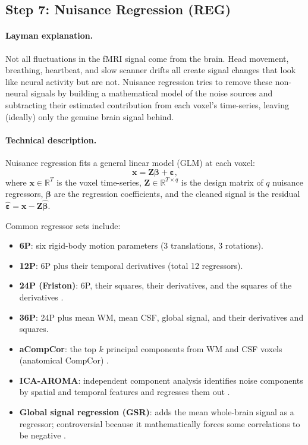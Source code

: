 \documentclass[11pt,a4paper]{article}
\begin{document}
\subsection{Step 7: Nuisance Regression (REG)}
\label{app:reg}

\paragraph{Layman explanation.}
Not all fluctuations in the fMRI signal come from the brain.  Head movement, breathing, heartbeat, and slow scanner drifts all create signal changes that look like neural activity but are not.  Nuisance regression tries to remove these non-neural signals by building a mathematical model of the noise sources and subtracting their estimated contribution from each voxel's time-series, leaving (ideally) only the genuine brain signal behind.

\paragraph{Technical description.}
Nuisance regression fits a general linear model (GLM) at each voxel:
\begin{equation}
    \mathbf{x} = \mathbf{Z}\boldsymbol\beta + \boldsymbol\varepsilon,
\end{equation}
where $\mathbf{x} \in \mathbb{R}^T$ is the voxel time-series, $\mathbf{Z} \in \mathbb{R}^{T \times q}$ is the design matrix of $q$ nuisance regressors, $\boldsymbol\beta$ are the regression coefficients, and the cleaned signal is the residual $\hat{\boldsymbol\varepsilon} = \mathbf{x} - \mathbf{Z}\hat{\boldsymbol\beta}$.

Common regressor sets include:
\begin{itemize}
    \item \textbf{6P}: six rigid-body motion parameters (3 translations, 3 rotations).
    \item \textbf{12P}: 6P plus their temporal derivatives (total 12 regressors).
    \item \textbf{24P (Friston)}: 6P, their squares, their derivatives, and the squares of the derivatives \citep{friston1996}.
    \item \textbf{36P}: 24P plus mean WM, mean CSF, global signal, and their derivatives and squares.
    \item \textbf{aCompCor}: the top $k$ principal components from WM and CSF voxels (anatomical CompCor) \citep{behzadi2007}.
    \item \textbf{ICA-AROMA}: independent component analysis identifies noise components by spatial and temporal features and regresses them out \citep{pruim2015}.
    \item \textbf{Global signal regression (GSR)}: adds the mean whole-brain signal as a regressor; controversial because it mathematically forces some correlations to be negative \citep{murphy2009}.
\end{itemize}
\end{document}

